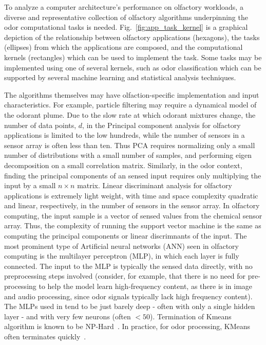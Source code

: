 % 

To analyze a computer architecture's performance on olfactory workloads, a
diverse and representative collection of olfactory algorithms underpinning the
odor computational tasks is needed.  Fig.~\ref{fig:app_task_kernel} is a graphical depiction of the relationship
between olfactory applications (hexagons), the tasks (ellipses) from which the
applications are composed, and the computational kernels (rectangles) which can
be used to implement the task.  Some tasks may be implemented using one of
several kernels, such as odor classification which can be supported by several
machine learning and statistical analysis techniques. 

The algorithms themselves may have olfaction-specific implementation and input characteristics.
For example, particle filtering may require a dynamical model of the
odorant plume.  
Due to the slow rate at which odorant mixtures change,
the number of data points, $d$, in the Principal component analysis for olfactory
applications is limited to the low hundreds,
while the number of sensors in a sensor array is often less than ten.
Thus PCA requires normalizing only a small number of distributions with
a small number of samples, and performing eigen decomposition on a small
correlation matrix.  Similarly, in the odor context, finding the
principal components of an sensed input requires only multiplying the input
by a small $n\times n$ matrix.
Linear discriminant analysis for olfactory applications is extremely light weight,
with time and space complexity quadratic  and linear, respectively,
in the number of sensors in the sensor array.
In olfactory computing, the input
sample is a vector of sensed values from the chemical sensor array. Thus, the
complexity of running the support vector machine is the same as computing the
principal components or linear discrimnants of the input.  
The most prominent type of Artificial neural networks (ANN) seen in olfactory computing is the multilayer
perceptron (MLP), in which each layer is fully connected. The input to the
MLP is typically the sensed data directly, with no preprocessing steps
involved (consider, for example, that there is no need for pre-processing
to help the model learn high-frequency content, as there is in image and audio
processing, since odor signals typically lack high frequency content).
The MLPs used in \olfc{} tend to be just barely deep - often with
only a single hidden layer - and with very few neurons (often $< 50$).
Termination of Kmeans algorithm is known to be NP-Hard~\cite{aloise2009np}.  In practice,
for odor processing, KMeans often terminates quickly~\cite{yang2018human,
zheng2019wearable}.





